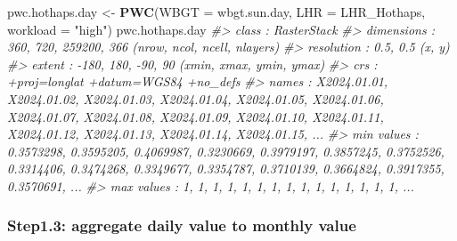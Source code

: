 \documentclass[
]{article}
\newenvironment{Shaded}{\begin{snugshade}}{\end{snugshade}}
\newcommand{\AttributeTok}[1]{\textcolor[rgb]{0.13,0.29,0.53}{#1}}
\newcommand{\CommentTok}[1]{\textcolor[rgb]{0.56,0.35,0.01}{\textit{#1}}}
\newcommand{\FunctionTok}[1]{\textcolor[rgb]{0.13,0.29,0.53}{\textbf{#1}}}
\newcommand{\NormalTok}[1]{#1}
\newcommand{\OtherTok}[1]{\textcolor[rgb]{0.56,0.35,0.01}{#1}}
\newcommand{\StringTok}[1]{\textcolor[rgb]{0.31,0.60,0.02}{#1}}
\begin{document}
\begin{Shaded}
\begin{Highlighting}[]
\NormalTok{pwc.hothaps.day }\OtherTok{\textless{}{-}} \FunctionTok{PWC}\NormalTok{(}\AttributeTok{WBGT =}\NormalTok{ wbgt.sun.day,  }\AttributeTok{LHR =}\NormalTok{ LHR\_Hothaps, }\AttributeTok{workload =} \StringTok{"high"}\NormalTok{)}
\NormalTok{pwc.hothaps.day}
\CommentTok{\#\textgreater{} class      : RasterStack }
\CommentTok{\#\textgreater{} dimensions : 360, 720, 259200, 366  (nrow, ncol, ncell, nlayers)}
\CommentTok{\#\textgreater{} resolution : 0.5, 0.5  (x, y)}
\CommentTok{\#\textgreater{} extent     : {-}180, 180, {-}90, 90  (xmin, xmax, ymin, ymax)}
\CommentTok{\#\textgreater{} crs        : +proj=longlat +datum=WGS84 +no\_defs }
\CommentTok{\#\textgreater{} names      : X2024.01.01, X2024.01.02, X2024.01.03, X2024.01.04, X2024.01.05, X2024.01.06, X2024.01.07, X2024.01.08, X2024.01.09, X2024.01.10, X2024.01.11, X2024.01.12, X2024.01.13, X2024.01.14, X2024.01.15, ... }
\CommentTok{\#\textgreater{} min values :   0.3573298,   0.3595205,   0.4069987,   0.3230669,   0.3979197,   0.3857245,   0.3752526,   0.3314406,   0.3474268,   0.3349677,   0.3354787,   0.3710139,   0.3664824,   0.3917355,   0.3570691, ... }
\CommentTok{\#\textgreater{} max values :           1,           1,           1,           1,           1,           1,           1,           1,           1,           1,           1,           1,           1,           1,           1, ...}
\end{Highlighting}
\end{Shaded}

\subsubsection{Step1.3: aggregate daily value to monthly
value}\label{step1.3-aggregate-daily-value-to-monthly-value}
\end{document}
